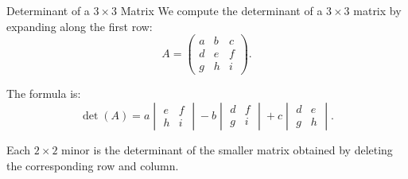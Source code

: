 \documentclass{beamer}
\begin{document}
\begin{frame}{Determinant of a \(3 \times 3\) Matrix}
We compute the determinant of a \(3 \times 3\) matrix by expanding along the first row:
\begin{equation}
A =
\begin{pmatrix} 
a & b & c \\ 
d & e & f \\ 
g & h & i 
\end{pmatrix}.
\end{equation}

The formula is:
\begin{equation}
\det(A) =
a 
\begin{vmatrix} 
e & f \\ h & i 
\end{vmatrix}
- b 
\begin{vmatrix} 
d & f \\ g & i 
\end{vmatrix}
+ c 
\begin{vmatrix} 
d & e \\ g & h 
\end{vmatrix}. \label{eq:det3x3_expansion}
\end{equation}

Each \(2 \times 2\) minor is the determinant of the smaller matrix obtained by deleting the corresponding row and column.
\end{frame}
\end{document}
